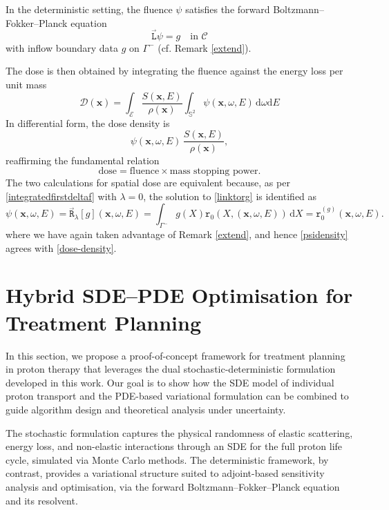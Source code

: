 \documentclass{amsart}
\newcommand{\dd}{{\mathrm d}}
\newcommand{\fL}{\stackrel{_\rightarrow}{\mathtt L}}
\newcommand{\fR}{\stackrel{_\rightarrow}{\mathtt R}}
\newcommand{\rr}{{\mathtt r}}
\theoremstyle{plain}
\renewcommand{\vec}[1]{\ensuremath{\boldsymbol{#1}}}
\begin{document}
In the deterministic setting, the fluence $\psi$ satisfies the forward
Boltzmann--Fokker--Planck equation
\begin{equation}
 \fL \psi  = g\quad \text{in } \mathcal{C}
 \label{linktorg}
\end{equation}
 with inflow boundary data $g$ on
$\Gamma^-$ {(cf. Remark \ref{extend})}.

 The dose is then obtained by integrating the fluence against the
energy loss per unit mass
\begin{equation}
  \mathcal{D}(\vec{x}) 
  = \int_{\mathcal{E}} \frac{S(\vec{x}, E)}{\rho(\vec{x})} \int_{\mathbb{S}^2} \psi(\vec{x}, \omega, E) \, \dd \omega \dd E
  \label{dose-deterministic}
\end{equation}
In differential form, the dose density is
\begin{equation}
  \psi(\vec{x}, \omega, E) \, \frac{S(\vec{x}, E)}{\rho(\vec{x})},
  \label{psidensity}
\end{equation}
reaffirming the fundamental relation
\begin{equation}
  \text{dose} = \text{fluence} \times \text{mass stopping power}.
\end{equation}
The two calculations for spatial dose are equivalent because, as per \eqref{integratedfirstdeltaf} with $\lambda = 0$, the solution to \eqref{linktorg} is identified as 
\begin{equation}
  \psi(\vec{x}, \omega, E) = \fR_\lambda[g](\vec{x}, \omega, E) = \int_{\Gamma^-}
  g(X) \rr_0(X, (\vec{x}, \omega, E))\,\dd X = \rr^{(g)}_0(\vec{x}, \omega, E).
\end{equation}
where we have again taken advantage of Remark \ref{extend}, and hence \eqref{psidensity} agrees with 
\eqref{dose-density}.


\section{Hybrid SDE--PDE Optimisation for Treatment Planning}
\label{sec:treatment}

In this section, we propose a proof-of-concept framework for treatment
planning in proton therapy that leverages the dual
stochastic-deterministic formulation developed in this work. Our goal
is to show how the SDE model of individual proton transport and the
PDE-based variational formulation can be combined to guide algorithm
design and theoretical analysis under uncertainty.

The stochastic formulation captures the physical randomness of elastic
scattering, energy loss, and non-elastic interactions through an SDE
for the full proton life cycle, simulated via Monte Carlo methods. The
deterministic framework, by contrast, provides a variational structure
suited to adjoint-based sensitivity analysis and optimisation, via the
forward Boltzmann--Fokker--Planck equation and its resolvent.
\end{document}
